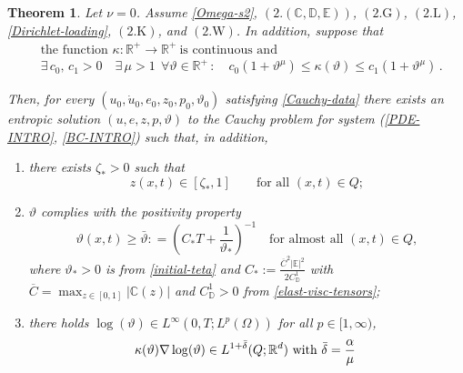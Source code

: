 \documentclass[a4paper,10pt,reqno]{amsart}
\numberwithin{equation}{section}
\newcommand{\R}{\mathbb{R}}
\numberwithin{equation}{section}
\newtheorem{theorem}{Theorem}[section]
\newcommand{\teta}{\vartheta}
\newcommand{\bbC}{\mathbb{C}}
\newcommand{\bbD}{\mathbb{D}}
\newcommand{\bbE}{\mathbb{E}}
\newcommand{\condu}{\kappa}
\newcommand{\EEE}{\color{black}}
\newcommand{\MMM}{\color{black}}%
\begin{document}
\begin{theorem}
\label{mainth:1}
Let $\nu=0$.
Assume
\eqref{Omega-s2},  $(2.(\bbC,\bbD,\bbE))$,   $(2.\mathrm{G})$,  $(2.\mathrm{L})$,  %
 \eqref{Dirichlet-loading},   $(2.\mathrm{K})$,  and $(2.\mathrm{W})$.  
In addition,  suppose that 
\begin{equation}
\label{hyp-K}
\tag{2.$\condu_1$}
\begin{aligned}
& \text{the function }   \condu: \R^+ \to \R^+  \  \text{
is
 continuous and}
\\
& \exists \, c_0, \, c_1>0 \quad \exists\,   \mu>1   \ \
\forall\teta\in \R^+\, :\quad
c_0 (1+ \teta^{\mu}) \leq \condu(\teta) \leq c_1 (1+\teta^{\mu})\,.
\end{aligned}
\end{equation}
\par
Then, for every $(u_0, \dot{u}_0, e_0,z_0, p_0,\teta_0) $ satisfying \eqref{Cauchy-data} there exists an \emph{entropic} solution $(u,e,z,p,\teta)$ 
to the Cauchy problem for system (\ref{PDE-INTRO}, \ref{BC-INTRO})
 such that, in addition,
 \begin{enumerate}
 \item there exists $\zeta_*>0$ such that 
 \begin{equation}
 \label{strong-pos-z}
 z(x,t) \in [\zeta_*, 1 ] \qquad \text{for all } (x,t) \in  Q;
 \end{equation}
 \item
   $\teta$ complies with the positivity property 
\begin{equation}
\label{strong-strict-pos}
 \teta(x,t) \geq \bar\teta : = \left( C_* T + \frac1{\teta_*}\right)^{-1} \quad \text{for almost all $(x,t) \in Q$},
\end{equation}
where
$\teta_*>0$ is  from \eqref{initial-teta} and $C_*:= \frac{ \overline{C}^2 |\bbE|^2}{2 C_\bbD^1} $ with
$\overline{C} = \max_{z\in [0,1]} |\bbC(z)|$ and 
 $C_\bbD^1>0$ from \eqref{elast-visc-tensors};
\item
 there holds \MMM $\log(\teta) \in L^\infty(0,T;L^p(\Omega))$ for all $p\in [1,\infty)$, \EEE
  \begin{equation}
\label{further-logteta}
\begin{gathered}
\condu(\teta)\nabla \log(\teta) \in  L^{1+\bar\delta}(Q;\R^d)   \text{ with   $ \bar\delta = \frac{\alpha}\mu $ 
}
\end{gathered}
\end{equation}
\end{enumerate}
\end{theorem}
\end{document}

